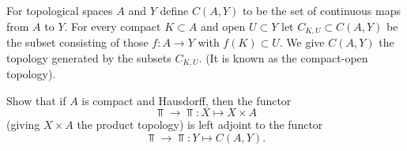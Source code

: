 \begin{exercise}[$\star$]
For topological spaces $A$ and $Y$ define $C(A,Y)$ to be the set of continuous maps from $A$ to $Y$.  For every compact $K\subset A$ and open $U\subset Y$ let $C_{K,U}\subset C(A,Y)$ be the subset consisting of those $f\colon A\to Y$ with $f(K)\subset U$. We give $C(A,Y)$ the topology generated by the subsets $C_{K,U}$. (It is known as the compact-open topology). 

Show that if $A$ is compact and Hausdorff, then the functor
\[
	\Top \to \Top \colon X \mapsto X\times A
\]
(giving $X\times A$ the product topology) is left adjoint to the functor
\[
	\Top \to \Top\colon Y \mapsto C(A,Y).
\]
\end{exercise}


